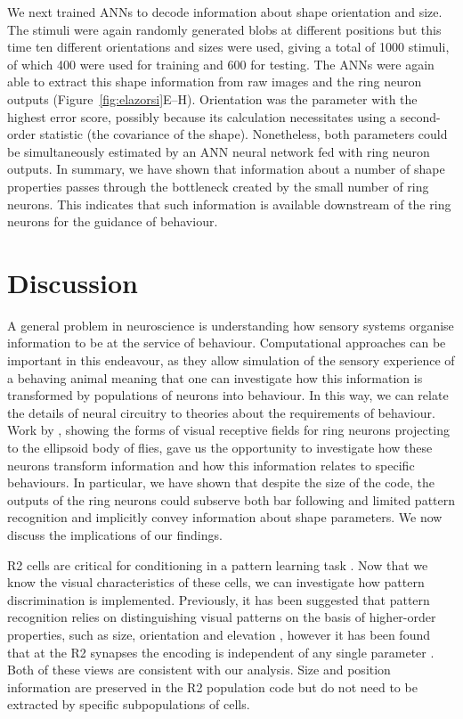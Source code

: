 We next trained ANNs to decode information about shape orientation and size. The stimuli were again randomly generated blobs at different positions but this time ten different orientations and sizes were used, giving a total of 1000 stimuli, of which 400 were used for training and 600 for testing. The ANNs were again able to extract this shape information from raw images and the ring neuron outputs (Figure~\ref{fig:elazorsi}E--H). Orientation was the parameter with the highest error score, possibly because its calculation necessitates using a second-order statistic (the covariance of the shape). Nonetheless, both parameters could be simultaneously estimated by an ANN neural network fed with ring neuron outputs. 
In summary, we have shown that information about a number of shape properties passes through the bottleneck created by the small number of ring neurons. This indicates that such information is available downstream of the ring neurons for the guidance of behaviour.

\section*{Discussion}
A general problem in neuroscience is understanding how sensory systems organise information to be at the service of behaviour. Computational approaches can be important in this endeavour, as they allow simulation of the sensory experience of a behaving animal meaning that one can investigate how this information is transformed by populations of neurons into behaviour. In this way, we can relate the details of neural circuitry to theories about the requirements of behaviour. Work by \cite{Seelig2013}, showing the forms of visual receptive fields for ring neurons projecting to the ellipsoid body of flies, gave us the opportunity to investigate how these neurons transform information and how this information relates to specific behaviours. In particular, we have shown that despite the size of the code, the outputs of the ring neurons could subserve both bar following and limited pattern recognition and implicitly convey information about shape parameters. We now discuss the implications of our findings.

R2 cells are critical for conditioning in a pattern learning task \cite{Pan2009}. Now that we know the visual characteristics of these cells, we can investigate how pattern discrimination is implemented. Previously, it has been suggested that pattern recognition relies on distinguishing visual patterns on the basis of higher-order properties, such as size, orientation and elevation \cite{Pan2009,Ernst1999}, however it has been found that at the R2 synapses the encoding is independent of any single parameter \cite{Liu2006}. Both of these views are consistent with our analysis. Size and position information are preserved in the R2 population code but do not need to be extracted by specific subpopulations of cells.

